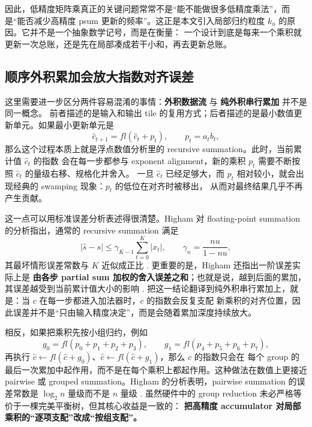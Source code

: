 \documentclass[UTF8,11pt,a4paper]{ctexart}
\newcommand{\ku}{\ensuremath{k_u}}
\begin{document}
因此，低精度矩阵乘真正的关键问题常常不是“能不能做很多低精度乘法”，而是“能否减少高精度 psum
更新的频率”。这正是本文引入局部归约粒度 \ku{} 的原因。它并不是一个抽象数学记号，而是在衡量：
一个设计到底是每来一个乘积就更新一次总账，还是先在局部凑成若干小和，再去更新总账。

\subsection{顺序外积累加会放大指数对齐误差}

这里需要进一步区分两件容易混淆的事情：\textbf{外积数据流} 与 \textbf{纯外积串行累加} 并不是同一概念。
前者描述的是输入和输出 tile 的复用方式；后者描述的是最小数值更新单元。如果最小更新单元是
\begin{equation}
  \hat{c}_{t+1} = fl(\hat{c}_t + p_t), \qquad p_t = a_t b_t,
\end{equation}
那么这个过程本质上就是浮点数值分析里的 recursive summation。此时，当前累计值 $\hat{c}_t$ 的指数
会在每一步都参与 exponent alignment，新的乘积 $p_t$ 需要不断按照 $\hat{c}_t$ 的量级右移、规格化并舍入。
一旦 $\hat{c}_t$ 已经足够大，而 $p_t$ 相对较小，就会出现经典的 swamping 现象：$p_t$ 的低位在对齐时被移出，
从而对最终结果几乎不再产生贡献。

这一点可以用标准误差分析表述得很清楚。Higham 对 floating-point summation 的分析指出，通常的
recursive summation 满足
\begin{equation}
  |\hat{s}-s| \le \gamma_{K-1}\sum_{t=0}^{K}|x_t|,
  \qquad
  \gamma_n = \frac{nu}{1-nu},
\end{equation}
其最坏情形误差常数与 $K$ 近似成正比 \cite{higham}. 更重要的是，Higham 还指出一阶误差实际上是
\textbf{由各步 partial sum 加权的舍入误差之和}；也就是说，越到后面的累加，其误差越受到当前累计值大小的影响
\cite{higham}. 把这一结论翻译到纯外积串行累加上，就是：当 $c$ 在每一步都进入加法器时，$c$ 的指数会反复支配
新乘积的对齐位置，因此误差并不是“只由输入精度决定”，而是会随着累加深度持续放大。

相反，如果把乘积先按小组归约，例如
\begin{equation}
  g_0 = fl(p_0 + p_1 + p_2 + p_3), \qquad
  g_1 = fl(p_4 + p_5 + p_6 + p_7),
\end{equation}
再执行 $\hat{c}\leftarrow fl(\hat{c}+g_0)$、$\hat{c}\leftarrow fl(\hat{c}+g_1)$，那么 $c$ 的指数只会在
每个 group 的最后一次累加中起作用，而不是在每个乘积上都起作用。这种做法在数值上更接近 pairwise 或 grouped
summation。Higham 的分析表明，pairwise summation 的误差常数是 $\log_2 n$ 量级而不是 $n$ 量级
\cite{higham}. 虽然硬件中的 group reduction 未必严格等价于一棵完美平衡树，但其核心收益是一致的：
\textbf{把高精度 accumulator 对局部乘积的“逐项支配”改成“按组支配”。}
\end{document}
